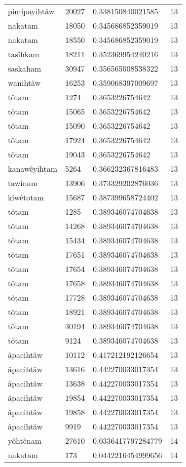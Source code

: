\begin{longtable}{llll}
pimipayihtâw & 20027 & 0.338150840021585 & 13 \\
nakatam & 18050 & 0.345686852359019 & 13 \\
nakatam & 18550 & 0.345686852359019 & 13 \\
tasîhkam & 18211 & 0.352369954240216 & 13 \\
saskaham & 30947 & 0.356565008538322 & 13 \\
wanihtâw & 16253 & 0.359068397009697 & 13 \\
tôtam & 1274 & 0.3653226754642 & 13 \\
tôtam & 15065 & 0.3653226754642 & 13 \\
tôtam & 15090 & 0.3653226754642 & 13 \\
tôtam & 17924 & 0.3653226754642 & 13 \\
tôtam & 19043 & 0.3653226754642 & 13 \\
kanawêyihtam & 5264 & 0.366232367816483 & 13 \\
tawinam & 13906 & 0.373329202876036 & 13 \\
kîwêtotam & 15687 & 0.387399658724402 & 13 \\
tôtam & 1285 & 0.389346074704638 & 13 \\
tôtam & 14268 & 0.389346074704638 & 13 \\
tôtam & 15434 & 0.389346074704638 & 13 \\
tôtam & 17651 & 0.389346074704638 & 13 \\
tôtam & 17654 & 0.389346074704638 & 13 \\
tôtam & 17658 & 0.389346074704638 & 13 \\
tôtam & 17728 & 0.389346074704638 & 13 \\
tôtam & 18921 & 0.389346074704638 & 13 \\
tôtam & 30194 & 0.389346074704638 & 13 \\
tôtam & 9124 & 0.389346074704638 & 13 \\
âpacihtâw & 10112 & 0.417212192126654 & 13 \\
âpacihtâw & 13616 & 0.442270033017354 & 13 \\
âpacihtâw & 13638 & 0.442270033017354 & 13 \\
âpacihtâw & 19854 & 0.442270033017354 & 13 \\
âpacihtâw & 19858 & 0.442270033017354 & 13 \\
âpacihtâw & 9919 & 0.442270033017354 & 13 \\
yôhtênam & 27610 & 0.0336417797284779 & 14 \\
nakatam & 173 & 0.0442216454999656 & 14 \\

\end{longtable}
